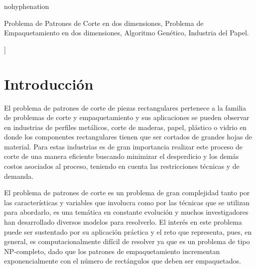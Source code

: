 \documentclass[a4paper,10pt,twocolumn]{article}
\begin{document}
\begin{hyphenrules}{nohyphenation}
\begin{enabstract}
\end{enabstract}

\begin{keywords}
	Problema de Patrones de Corte en dos dimensiones,
	Problema de Empaquetamiento en dos dimensiones,
	Algoritmo Genético,
	Industria del Papel.
\end{keywords}



\vspace{0.8cm}
]



\section{Introducción}\label{sec:intro}
El problema de patrones de corte de piezas rectangulares pertenece a
la familia de problemas de corte y empaquetamiento y sus
aplicaciones se pueden observar en industrias de perfiles
metálicos, corte de maderas, papel, plástico o vidrio en
donde los componentes rectangulares tienen que ser
cortados de grandes hojas de material. Para estas industrias es de gran importancia realizar
este proceso de corte de una manera eficiente buscando
minimizar el desperdicio y los demás costos asociados
al proceso, teniendo en cuenta las restricciones técnicas
y de demanda. 



El problema de patrones de corte es un problema de gran
complejidad tanto por las características y variables
que involucra como por las técnicas que se utilizan
para abordarlo, es una temática en constante evolución
y muchos investigadores han desarrollado diversos
modelos para resolverlo. El interés en este problema
puede ser sustentado por su aplicación práctica y el
reto que representa, pues, en general,
es computacionalmente difícil de resolver ya que es un
problema de tipo NP-completo, dado que los patrones de
empaquetamiento incrementan exponencialmente con el
número de rectángulos que deben ser empaquetados. 
 

\end{hyphenrules}
\end{document}
